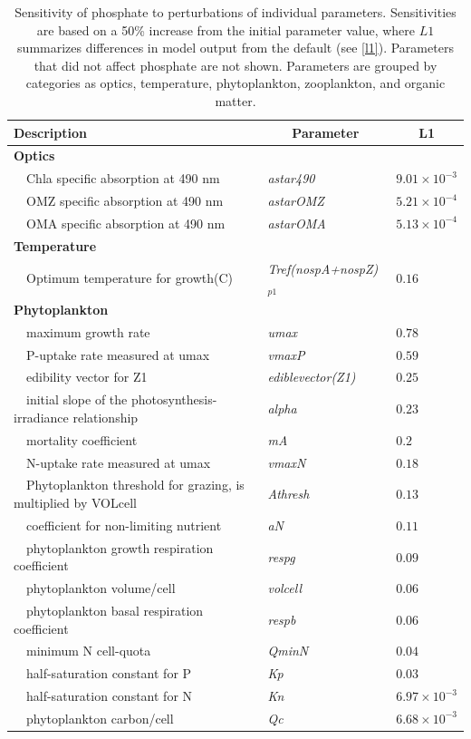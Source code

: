 \documentclass[letterpaper,12pt,oneside]{article}\usepackage[]{graphicx}\usepackage[]{color}
\begin{document}
\begin{table}[!tbp]
{\footnotesize
\caption{Sensitivity of phosphate to perturbations of individual parameters.  Sensitivities are based on a 50\% increase from the initial parameter value, where $L1$ summarizes differences in model output from the default (see \cref{l1}).  Parameters that did not affect phosphate are not shown.  Parameters are grouped by categories as optics, temperature, phytoplankton, zooplankton, and organic matter.\label{tab:po4sens}} 
\begin{center}
\begin{tabular}{lll}
\hline\hline
\multicolumn{1}{l}{Description}&\multicolumn{1}{c}{Parameter}&\multicolumn{1}{c}{L1}\tabularnewline
\hline
{\bfseries Optics}&&\tabularnewline
~~Chla specific absorption at 490 nm&\textit{astar490}&$9.01\times 10^{-3}$\tabularnewline
~~OMZ specific absorption at 490 nm&\textit{astarOMZ}&$5.21\times 10^{-4}$\tabularnewline
~~OMA specific absorption at 490 nm&\textit{astarOMA}&$5.13\times 10^{-4}$\tabularnewline
\hline
{\bfseries Temperature}&&\tabularnewline
~~Optimum temperature for growth(C)&\textit{Tref(nospA+nospZ)$_{p1}$}&$0.16$\tabularnewline
\hline
{\bfseries Phytoplankton}&&\tabularnewline
~~maximum growth rate&\textit{umax}&$0.78$\tabularnewline
~~P-uptake rate measured at umax&\textit{vmaxP}&$0.59$\tabularnewline
~~edibility vector for Z1&\textit{ediblevector(Z1)}&$0.25$\tabularnewline
~~initial slope of the photosynthesis-irradiance relationship&\textit{alpha}&$0.23$\tabularnewline
~~mortality coefficient&\textit{mA}&$0.2$\tabularnewline
~~N-uptake rate measured at umax&\textit{vmaxN}&$0.18$\tabularnewline
~~Phytoplankton threshold for grazing, is multiplied by VOLcell&\textit{Athresh}&$0.13$\tabularnewline
~~coefficient for non-limiting nutrient&\textit{aN}&$0.11$\tabularnewline
~~phytoplankton growth respiration coefficient&\textit{respg}&$0.09$\tabularnewline
~~phytoplankton volume/cell&\textit{volcell}&$0.06$\tabularnewline
~~phytoplankton basal respiration coefficient&\textit{respb}&$0.06$\tabularnewline
~~minimum N cell-quota&\textit{QminN}&$0.04$\tabularnewline
~~half-saturation constant for P&\textit{Kp}&$0.03$\tabularnewline
~~half-saturation constant for N&\textit{Kn}&$6.97\times 10^{-3}$\tabularnewline
~~phytoplankton carbon/cell&\textit{Qc}&$6.68\times 10^{-3}$\tabularnewline

\end{tabular}
\end{center}}
\end{table}
\end{document}
